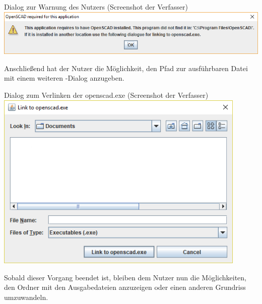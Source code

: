 \begin{Bild}{Dialog zur Warnung des Nutzers (Screenshot der Verfasser)}
	\includegraphics[width = \textwidth]{Bilder/GUI/GUI_SCAD_Error}
\end{Bild}

Anschließend hat der Nutzer die Möglichkeit, den Pfad zur ausführbaren Datei mit einem weiteren -Dialog anzugeben.

\begin{Bild}{Dialog zum Verlinken der openscad.exe (Screenshot der Verfasser)}
	\includegraphics[width = 120mm]{Bilder/GUI/GUI_SCAD_Linking}
\end{Bild}

Sobald dieser Vorgang beendet ist, bleiben dem Nutzer nun die Möglichkeiten, den Ordner mit den Ausgabedateien anzuzeigen oder einen anderen Grundriss umzuwandeln.\\